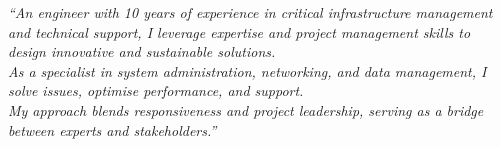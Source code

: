\documentclass[10pt,a4paper,ragged2e,withhyper,normalphoto]{altacv}
\renewenvironment{quote}{\color{accent}\itshape}{\par}
\begin{document}




\makecvheader

\begin{quote}
``An engineer with 10 years of experience in critical infrastructure management and technical support, I leverage expertise and project management skills to design innovative and sustainable solutions. \\
As a specialist in system administration, networking, and data management, I solve issues, optimise performance, and support. \\
My approach blends responsiveness and project leadership, serving as a bridge between experts and stakeholders.''
\end{quote}
\end{document}
